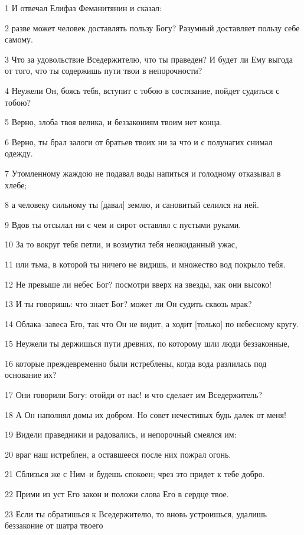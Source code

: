 \par 1 И отвечал Елифаз Феманитянин и сказал:
\par 2 разве может человек доставлять пользу Богу? Разумный доставляет пользу себе самому.
\par 3 Что за удовольствие Вседержителю, что ты праведен? И будет ли Ему выгода от того, что ты содержишь пути твои в непорочности?
\par 4 Неужели Он, боясь тебя, вступит с тобою в состязание, пойдет судиться с тобою?
\par 5 Верно, злоба твоя велика, и беззакониям твоим нет конца.
\par 6 Верно, ты брал залоги от братьев твоих ни за что и с полунагих снимал одежду.
\par 7 Утомленному жаждою не подавал воды напиться и голодному отказывал в хлебе;
\par 8 а человеку сильному ты [давал] землю, и сановитый селился на ней.
\par 9 Вдов ты отсылал ни с чем и сирот оставлял с пустыми руками.
\par 10 За то вокруг тебя петли, и возмутил тебя неожиданный ужас,
\par 11 или тьма, в которой ты ничего не видишь, и множество вод покрыло тебя.
\par 12 Не превыше ли небес Бог? посмотри вверх на звезды, как они высоко!
\par 13 И ты говоришь: что знает Бог? может ли Он судить сквозь мрак?
\par 14 Облака--завеса Его, так что Он не видит, а ходит [только] по небесному кругу.
\par 15 Неужели ты держишься пути древних, по которому шли люди беззаконные,
\par 16 которые преждевременно были истреблены, когда вода разлилась под основание их?
\par 17 Они говорили Богу: отойди от нас! и что сделает им Вседержитель?
\par 18 А Он наполнял домы их добром. Но совет нечестивых будь далек от меня!
\par 19 Видели праведники и радовались, и непорочный смеялся им:
\par 20 враг наш истреблен, а оставшееся после них пожрал огонь.
\par 21 Сблизься же с Ним--и будешь спокоен; чрез это придет к тебе добро.
\par 22 Прими из уст Его закон и положи слова Его в сердце твое.
\par 23 Если ты обратишься к Вседержителю, то вновь устроишься, удалишь беззаконие от шатра твоего
